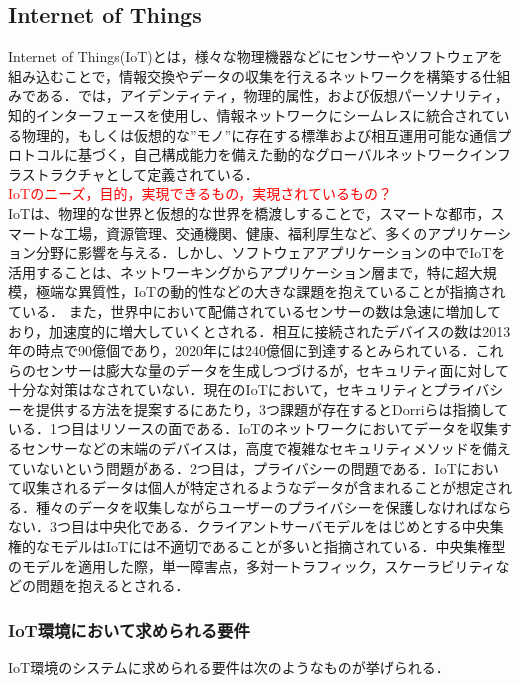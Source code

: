 \documentclass{kuisthesis}			%
\begin{document}
\subsection{Internet of Things}
Internet of Things(IoT)とは，様々な物理機器などにセンサーやソフトウェアを組み込むことで，情報交換やデータの収集を行えるネットワークを構築する仕組みである．\cite{Vermesan2009}では，アイデンティティ，物理的属性，および仮想パーソナリティ，知的インターフェースを使用し、情報ネットワークにシームレスに統合されている物理的，もしくは仮想的な”モノ”に存在する標準および相互運用可能な通信プロトコルに基づく，自己構成能力を備えた動的なグローバルネットワークインフラストラクチャとして定義されている．\\
\textcolor{red}{IoTのニーズ，目的，実現できるもの，実現されているもの？}\\
IoTは、物理的な世界と仮想的な世界を橋渡しすることで，スマートな都市，スマートな工場，資源管理、交通機関、健康、福利厚生など、多くのアプリケーション分野に影響を与える．しかし、ソフトウェアアプリケーションの中でIoTを活用することは、ネットワーキングからアプリケーション層まで，特に超大規模，極端な異質性，IoTの動的性などの大きな課題を抱えていることが指摘されている\cite{Bouloukakis2016}．
また，世界中において配備されているセンサーの数は急速に増加しており，加速度的に増大していくとされる．相互に接続されたデバイスの数は2013年の時点で90億個であり，2020年には240億個に到達するとみられている\cite{gubbi2013internet}．これらのセンサーは膨大な量のデータを生成しつづけるが，セキュリティ面に対して十分な対策はなされていない．現在のIoTにおいて，セキュリティとプライバシーを提供する方法を提案するにあたり，3つ課題が存在するとDorriら\cite{dorri2017towards}は指摘している．1つ目はリソースの面である．IoTのネットワークにおいてデータを収集するセンサーなどの末端のデバイスは，高度で複雑なセキュリティメソッドを備えていないという問題がある．2つ目は，プライバシーの問題である．IoTにおいて収集されるデータは個人が特定されるようなデータが含まれることが想定される．種々のデータを収集しながらユーザーのプライバシーを保護しなければならない．3つ目は中央化である．クライアントサーバモデルをはじめとする中央集権的なモデルはIoTには不適切であることが多いと指摘されている．中央集権型のモデルを適用した際，単一障害点，多対一トラフィック，スケーラビリティなどの問題を抱えるとされる．\\

\subsubsection{IoT環境において求められる要件}
IoT環境のシステムに求められる要件は次のようなものが挙げられる．
\end{document}
